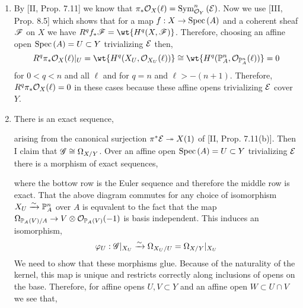 \documentclass[12pt]{article}
\begin{document}
\begin{enumerate}
\item By [II, Prop. 7.11] we know that $\pi_* \mathcal{O}_{X}(\ell) = \mathrm{Sym}^n_{\mathcal{O}_{Y}}\left( \mathcal{E} \right)$. Now we use [III, Prop. 8.5] which shows that for a map $f : X \to \mathrm{Spec}\left( A \right)$ and a coherent sheaf $\mathscr{F}$ on $X$ we have $R^q f_* \F = \wt{H^q(X, \F)}$. Therefore, choosing an affine open $\mathrm{Spec}\left( A \right) = U \subset Y$ trivializing $\mathcal{E}$ then,
\[ R^q \pi_* \struct{X}(\ell) |_U = \wt{H^q(X_U, \struct{X_U}(\ell))}  \cong \wt{H^q(\P^n_A, \struct{\P^n_A}(\ell))} = 0 \]
for $0 < q < n$ and all $\ell$ and for $q = n$ and $\ell > -(n+1)$. Therefore, $R^q \pi_* \mathcal{O}_{X}(\ell) = 0$ in these cases because these affine opens trivializing $\mathcal{E}$ cover $Y$. 

\item There is an exact sequence,
\begin{center}
\end{center}
arising from the canonical surjection $\pi^* \mathcal{E} \twoheadrightarrow \strut{X}(1)$ of [II, Prop. 7.11(b)]. Then I claim that $\mathscr{G} \cong \Omega_{X/Y}$. Over an affine open $\mathrm{Spec}\left( A \right) = U \subset Y$ trivializing $\mathcal{E}$ there is a morphism of exact sequences,
\begin{center}
\end{center}
where the bottow row is the Euler sequence and therefore the middle row is exact. That the above diagram commutes for any choice of isomorphism $X_U \xrightarrow{\sim} \mathbb{P}^n_A$ over $A$ is equvalent to the fact that the map $\Omega_{\mathbb{P}_A(V)/A} \to V \otimes \mathcal{O}_{\mathbb{P}_A(V)}(-1)$ is basis independent. This induces an isomorphism,
\[ \varphi_U : \mathscr{G} |_{X_U} \xrightarrow{\sim} \Omega_{X_U/U} = \Omega_{X/Y}|_{X_U} \]
We need to show that these morphisms glue. Because of the naturality of the kernel, this map is unique and restricts correctly along inclusions of opens on the base. Therefore, for affine opens $U, V \subset Y$ and an affine open $W \subset U \cap V$ we see that,

\end{enumerate}
\end{document}
